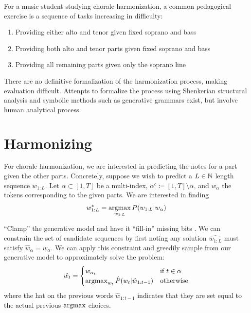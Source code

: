 For a music student studying chorale harmonization, a common pedagogical
exercise \citep{denny1960oxford}\citep{piston1978harmony} is a sequence of tasks increasing in difficulty:
\begin{enumerate}
  \item Providing either alto and tenor given fixed soprano and bass
  \item Providing both alto and tenor parts given fixed soprano and bass
  \item Providing all remaining parts given only the soprano line
\end{enumerate}

There are no definitive formalization of the harmonization process, making
evaluation difficult. Attenpts to formalize the process using Shenkerian
structural analysis \citep{oswald1973harmony} and symbolic methods such as
generative grammars \citep{lerdahl1983jackendoff}\citep{winograd1968linguistics}
exist, but involve human analytical process.

\section{Harmonizing}


For chorale harmonization, we are interested in predicting the notes for a part
given the other parts. Concretely, suppose we wish to predict a $L \in \mathbb{N}$
length sequence $w_{1:L}$. Let $\alpha \subset [1,T]$ be a multi-index,
$\alpha^c \coloneqq [1,T] \setminus \alpha$, and $w_\alpha$ the tokens
corresponding to the given parts. We are interested in finding
\begin{equation}
  w_{1:L}^* = \operatorname*{argmax}_{w_{1:L}} P(w_{1:L} | w_{\alpha})
\end{equation}


``Clamp'' the generative model and have it ``fill-in'' missing bits
\citep{hinton1986learning}. We can constrain the set of candidate sequences by
first noting any solution $\hat{w_{1:L}}$ must satisfy $\hat{w}_\alpha =
w_\alpha$. We can apply this constraint and greedily sample from our generative
model to approximately solve the problem:
\begin{equation}
  \hat{w_{t}} = \begin{cases}
    w_{\alpha_t} &\text{if}~t \in \alpha \\
    \operatorname*{argmax}_{w_t} \hat{P}(w_t | \hat{w}_{1:t-1}) &\text{otherwise}
  \end{cases}
\end{equation}
where the hat on the previous words $\hat{w}_{1:t-1}$ indicates that they are
set equal to the actual previous $\operatorname*{argmax}$ choices.

